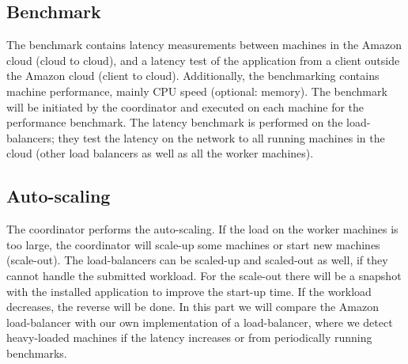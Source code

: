\documentclass[paper=a4, fontsize=11pt]{scrartcl} %
\numberwithin{equation}{section} %
\numberwithin{figure}{section} %
\numberwithin{table}{section} %
\begin{document}
\subsection{Benchmark}

The benchmark contains latency measurements between machines in the Amazon cloud (cloud to cloud), and a latency test of the application from a client outside the Amazon cloud (client to cloud). Additionally, the benchmarking contains machine performance, mainly CPU speed (optional: memory). The benchmark will be initiated by the coordinator and executed on each machine for the performance benchmark. The latency benchmark is performed on the load-balancers; they test the latency on the network to all running machines in the cloud (other load balancers as well as all the worker machines).

\subsection{Auto-scaling}

The coordinator performs the auto-scaling. If the load on the worker machines is too large, the coordinator will scale-up some machines or start new machines (scale-out). The load-balancers can be scaled-up and scaled-out as well, if they cannot handle the submitted workload. For the scale-out there will be a snapshot with the installed application to improve the start-up time. 
If the workload decreases, the reverse will be done.
In this part we will compare the Amazon load-balancer with our own implementation of a load-balancer, where we detect heavy-loaded machines if the latency increases or from periodically running benchmarks.
\end{document}
